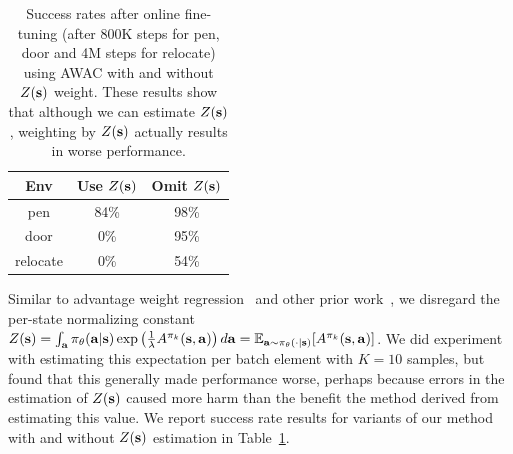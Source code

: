 \documentclass[conference]{IEEEtran}
\begin{document}
\begin{table}[h!]
\footnotesize
\begin{tabular}{c|c|c}
Env      & \shortstack{Use \\ $Z(\mathbf{s})$} & \shortstack{Omit \\ $Z(\mathbf{s})$} \\ \hline
pen      & 84\%      & 98\%    \\
door     & 0\%      & 95\%    \\
relocate & 0\%      & 54\%
\end{tabular}
\caption{Success rates after online fine-tuning (after 800K steps for pen, door and 4M steps for relocate) using AWAC with and without $Z(\mathbf{s})$ weight. These results show that although we can estimate $Z(\mathbf{s})$, weighting by $Z(\mathbf{s})$ actually results in worse performance.}
\label{fig:z}
\end{table}

Similar to advantage weight regression~\citep{peng2019awr} and other prior work~\citep{neumann2008fqiawr, wang2018marwil, siegel2020abm},
we disregard the per-state normalizing constant $Z(\mathbf{s}) = \int_{\mathbf{a}} \pi_\theta(\mathbf{a}|\mathbf{s}) \exp \left(\frac{1}{\lambda}A^{\pi_k}(\mathbf{s}, \mathbf{a})\right) d\mathbf{a} = \mathbb{E}_{\mathbf{a} \sim \pi_\theta(\cdot|\mathbf{s})}[A^{\pi_k}(\mathbf{s}, \mathbf{a})]$. We did experiment with estimating this expectation per batch element with $K=10$ samples,
but found that this generally made performance worse, perhaps because errors in the estimation of $Z(\mathbf{s})$ caused more harm than the benefit the method derived from estimating this value. We report success rate results for variants of our method with and without $Z(\mathbf{s})$ estimation in Table~\ref{fig:z}.
\end{document}
